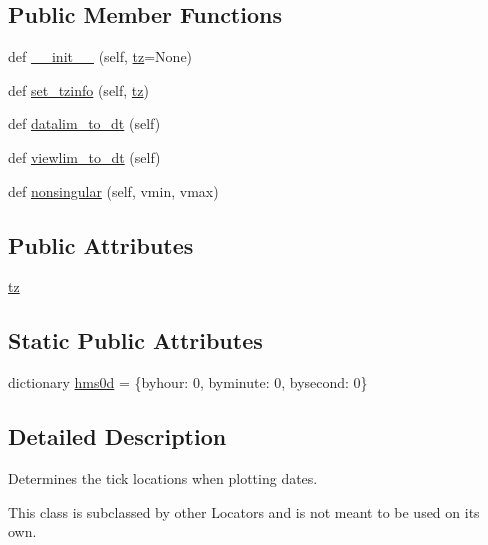 \subsection*{Public Member Functions}
\begin{DoxyCompactItemize}
\item 
def \hyperlink{classmatplotlib_1_1dates_1_1DateLocator_a82fd53e8023a48be7fa55bc79fedea13}{\+\_\+\+\_\+init\+\_\+\+\_\+} (self, \hyperlink{classmatplotlib_1_1dates_1_1DateLocator_aa18faf34dbf00ed4820535b64cd7194e}{tz}=None)
\item 
def \hyperlink{classmatplotlib_1_1dates_1_1DateLocator_a94cd2ae917975bd86dead610d33343e1}{set\+\_\+tzinfo} (self, \hyperlink{classmatplotlib_1_1dates_1_1DateLocator_aa18faf34dbf00ed4820535b64cd7194e}{tz})
\item 
def \hyperlink{classmatplotlib_1_1dates_1_1DateLocator_a91550e4147b4af8c579c5bccb1b2ccfc}{datalim\+\_\+to\+\_\+dt} (self)
\item 
def \hyperlink{classmatplotlib_1_1dates_1_1DateLocator_ae1d155b2851ac2f411d30654579bea14}{viewlim\+\_\+to\+\_\+dt} (self)
\item 
def \hyperlink{classmatplotlib_1_1dates_1_1DateLocator_a0cfaffdc89717c1f4f995b334804428e}{nonsingular} (self, vmin, vmax)
\end{DoxyCompactItemize}
\subsection*{Public Attributes}
\begin{DoxyCompactItemize}
\item 
\hyperlink{classmatplotlib_1_1dates_1_1DateLocator_aa18faf34dbf00ed4820535b64cd7194e}{tz}
\end{DoxyCompactItemize}
\subsection*{Static Public Attributes}
\begin{DoxyCompactItemize}
\item 
dictionary \hyperlink{classmatplotlib_1_1dates_1_1DateLocator_aae3348d2157eff75831c70b43dd60134}{hms0d} = \{\textquotesingle{}byhour\textquotesingle{}\+: 0, \textquotesingle{}byminute\textquotesingle{}\+: 0, \textquotesingle{}bysecond\textquotesingle{}\+: 0\}
\end{DoxyCompactItemize}


\subsection{Detailed Description}
\begin{DoxyVerb}Determines the tick locations when plotting dates.

This class is subclassed by other Locators and
is not meant to be used on its own.
\end{DoxyVerb}
 

